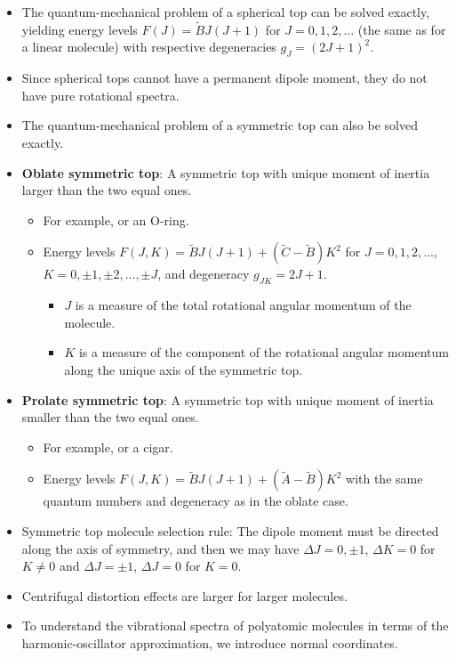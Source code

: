 \documentclass[../notes.tex]{subfiles}
\begin{document}
\begin{itemize}
    \item The quantum-mechanical problem of a spherical top can be solved exactly, yielding energy levels $F(J)=\tilde{B}J(J+1)$ for $J=0,1,2,\dots$ (the same as for a linear molecule) with respective degeneracies $g_J=(2J+1)^2$.
    \item Since spherical tops cannot have a permanent dipole moment, they do not have pure rotational spectra.
    \item The quantum-mechanical problem of a symmetric top can also be solved exactly.
    \item \textbf{Oblate symmetric top}: A symmetric top with unique moment of inertia larger than the two equal ones.
    \begin{itemize}
        \item For example,  or an O-ring.
        \item Energy levels $F(J,K)=\tilde{B}J(J+1)+(\tilde{C}-\tilde{B})K^2$ for $J=0,1,2,\dots$, $K=0,\pm 1,\pm 2,\dots,\pm J$, and degeneracy $g_{JK}=2J+1$.
        \begin{itemize}
            \item $J$ is a measure of the total rotational angular momentum of the molecule.
            \item $K$ is a measure of the component of the rotational angular momentum along the unique axis of the symmetric top.
        \end{itemize}
    \end{itemize}
    \item \textbf{Prolate symmetric top}: A symmetric top with unique moment of inertia smaller than the two equal ones.
    \begin{itemize}
        \item For example,  or a cigar.
        \item Energy levels $F(J,K)=\tilde{B}J(J+1)+(\tilde{A}-\tilde{B})K^2$ with the same quantum numbers and degeneracy as in the oblate case.
    \end{itemize}
    \item Symmetric top molecule selection rule: The dipole moment must be directed along the axis of symmetry, and then we may have $\Delta J=0,\pm 1$, $\Delta K=0$ for $K\neq 0$ and $\Delta J=\pm 1$, $\Delta J=0$ for $K=0$.
    \item Centrifugal distortion effects are larger for larger molecules.
    \item To understand the vibrational spectra of polyatomic molecules in terms of the harmonic-oscillator approximation, we introduce normal coordinates.

\end{itemize}
\end{document}
